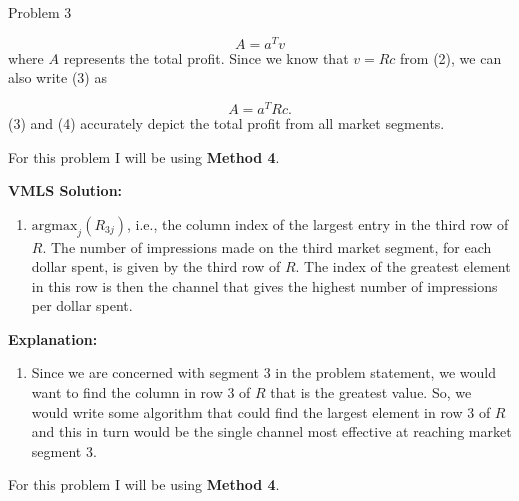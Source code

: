 \begin{problem}{Problem 3}
\begin{Highlight}
\begin{enumerate}[label = (\alph*), start = 3]
            \begin{equation}
                A = a^{T}v
            \end{equation}
            where $A$ represents the total profit. Since we know that $v = Rc$ from (2), we can also write (3) as

            \begin{equation}
                A = a^{T}Rc.
            \end{equation}
            (3) and (4) accurately depict the total profit from all market segments.
        \end{enumerate}
    \end{Highlight}

    \begin{Highlight}
        For this problem I will be using \textbf{Method 4}. \vspace*{1em}

        \noindent \textbf{VMLS Solution:}

        \begin{enumerate}[label = (\alph*), start = 4]
            \item $\text{argmax}_{j}(R_{3j})$, i.e., the column index of the largest entry in the third row of $R$. The number of impressions made on the third market segment, for each dollar spent, is
            given by the third row of $R$. The index of the greatest element in this row is then the channel that gives the highest number of impressions per dollar spent.
        \end{enumerate}

        \noindent \textbf{Explanation:}

        \begin{enumerate}[label = (\alph*), start = 4]
            \item Since we are concerned with segment 3 in the problem statement, we would want to find the column in row 3 of $R$ that is the greatest value. So, we would write some algorithm that
            could find the largest element in row 3 of $R$ and this in turn would be the single channel most effective at reaching market segment 3.
        \end{enumerate}
    \end{Highlight}

    \begin{Highlight}
        For this problem I will be using \textbf{Method 4}. \vspace*{1em}


\end{Highlight}
\end{problem}
